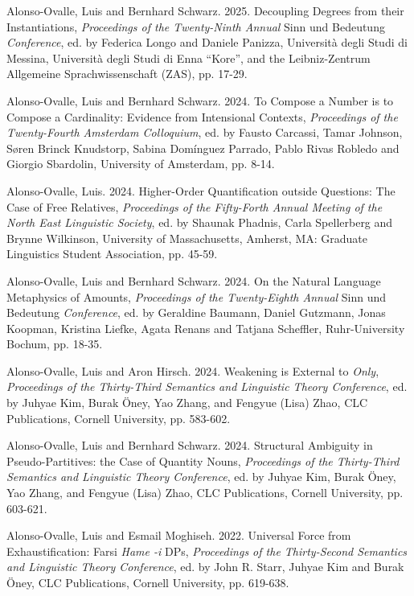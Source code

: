 \documentclass[11pt]{article}
\begin{document}

Alonso-Ovalle, Luis and Bernhard Schwarz. 2025. Decoupling Degrees from their Instantiations, \textit{Proceedings of the Twenty-Ninth Annual} Sinn und Bedeutung \textit{Conference}, ed. by Federica Longo and Daniele Panizza,  Universit\`a degli Studi di Messina, Universit\`a degli Studi di Enna ``Kore'', and the Leibniz-Zentrum Allgemeine Sprachwissenschaft (ZAS), pp. 17-29.


Alonso-Ovalle, Luis and Bernhard Schwarz. 2024. To Compose a Number is to Compose a Cardinality: Evidence from Intensional Contexts, \textit{Proceedings of the Twenty-Fourth Amsterdam Colloquium}, ed. by Fausto Carcassi, Tamar Johnson, Søren Brinck Knudstorp,
Sabina Domínguez Parrado, Pablo Rivas Robledo
and Giorgio Sbardolin, University of Amsterdam, pp. 8-14.

Alonso-Ovalle, Luis. 2024. Higher-Order Quantification outside Questions: The Case of Free Relatives, \textit{Proceedings of the Fifty-Forth Annual Meeting of the North East Linguistic Society}, ed. by Shaunak Phadnis, Carla Spellerberg and Brynne Wilkinson, University of Massachusetts, Amherst, MA: Graduate Linguistics Student Association, pp. 45-59.

Alonso-Ovalle, Luis and Bernhard Schwarz. 2024. On the Natural Language Metaphysics of Amounts, \textit{Proceedings of the Twenty-Eighth Annual} Sinn und Bedeutung \textit{Conference}, ed. by Geraldine Baumann, Daniel Gutzmann, Jonas Koopman, Kristina Liefke, Agata Renans and Tatjana Scheffler, Ruhr-University Bochum, pp. 18-35.


Alonso-Ovalle, Luis and Aron Hirsch. 2024. Weakening is External to \textit{Only}, \textit{Proceedings of the Thirty-Third Semantics and Linguistic Theory Conference}, ed. by Juhyae Kim, Burak \"{O}ney, Yao Zhang, and Fengyue (Lisa) Zhao, CLC Publications, Cornell University, pp. 583-602.

Alonso-Ovalle, Luis and Bernhard Schwarz. 2024. Structural Ambiguity in Pseudo-Partitives: the Case of Quantity Nouns, \textit{Proceedings of the Thirty-Third Semantics and Linguistic Theory Conference}, ed. by Juhyae Kim, Burak \"{O}ney, Yao Zhang, and Fengyue (Lisa) Zhao, CLC Publications, Cornell University, pp. 603-621. %


Alonso-Ovalle, Luis and Esmail Moghiseh. 2022. Universal Force from Exhaustification: Farsi \textit{Hame -i} DPs, \textit{Proceedings of the Thirty-Second Semantics and Linguistic Theory Conference}, ed. by John R. Starr, Juhyae Kim and Burak \"{O}ney, CLC Publications, Cornell University, pp. 619-638. %
\end{document}
